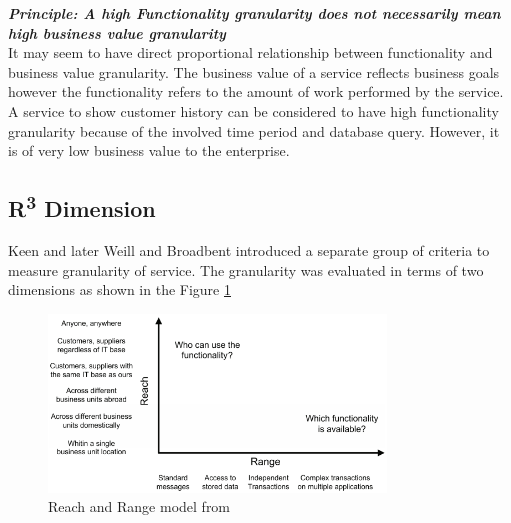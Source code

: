 \begin{framed}
\textbf{\textit{Principle: A high Functionality granularity does not necessarily mean high business value granularity}}
\\
It may seem to have direct proportional relationship between functionality and business value granularity. The business value of a service reflects business goals however the functionality refers to the amount of work performed by the service. A service to show customer history can be considered to have high functionality granularity because of the involved time period and database query. However, it is of very low business value to the enterprise. \cite{Raf-Haesen:2015aa}
\end{framed}


\subsection{R\textsuperscript{3} Dimension}\label{subsection:granularity/dimensions/r3}
Keen \cite{Keen:2015aa} and later  Weill and Broadbent \cite{Weill:1998aa} introduced a separate group of criteria to measure granularity of service. The granularity was evaluated in terms of two dimensions as shown in the Figure \ref{fig:Reach-Range Model}

\begin{figure}[H]
\begin{center}
\includegraphics[width=0.8\textwidth]{figures/Granularity-R3-one}
\caption{Reach and Range model from \cite{Keen:2015aa, Weill:1998aa}}
\label{fig:Reach-Range Model}
\end{center}
\end{figure}

